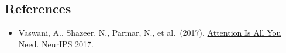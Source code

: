 \FloatBarrier
{}
\hypertarget{references-69}{%
\subsection{References}\label{references-69}}

\vspace{0.25em}
\begin{itemize}
\tightlist
\item
  Vaswani, A., Shazeer, N., Parmar, N., et al.~(2017). \href{https://arxiv.org/abs/1706.03762}{Attention Is All You Need}. NeurIPS 2017.
\end{itemize}

\clearpage
